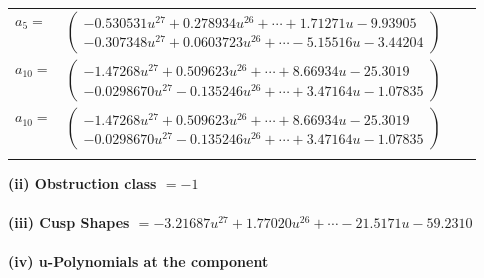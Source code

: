 \documentclass[1p]{elsarticle_modified}
\theoremstyle{definition}
\begin{document}
\begin{tabular}{m{7pt} m{180pt} m{7pt} m{180pt} }
\flushright $a_{5}=$&$\begin{pmatrix}-0.530531 u^{27}+0.278934 u^{26}+\cdots+1.71271 u-9.93905\\-0.307348 u^{27}+0.0603723 u^{26}+\cdots-5.15516 u-3.44204\end{pmatrix}$ \\
\flushright $a_{10}=$&$\begin{pmatrix}-1.47268 u^{27}+0.509623 u^{26}+\cdots+8.66934 u-25.3019\\-0.0298670 u^{27}-0.135246 u^{26}+\cdots+3.47164 u-1.07835\end{pmatrix}$\\ \flushright $a_{10}=$&$\begin{pmatrix}-1.47268 u^{27}+0.509623 u^{26}+\cdots+8.66934 u-25.3019\\-0.0298670 u^{27}-0.135246 u^{26}+\cdots+3.47164 u-1.07835\end{pmatrix}$\\&\end{tabular}
\flushleft \textbf{(ii) Obstruction class $= -1$}\\~\\
\flushleft \textbf{(iii) Cusp Shapes $= -3.21687 u^{27}+1.77020 u^{26}+\cdots-21.5171 u-59.2310$}\\~\\
\newpage\renewcommand{\arraystretch}{1}
\flushleft \textbf{(iv) u-Polynomials at the component}\newline \\
\end{document}
